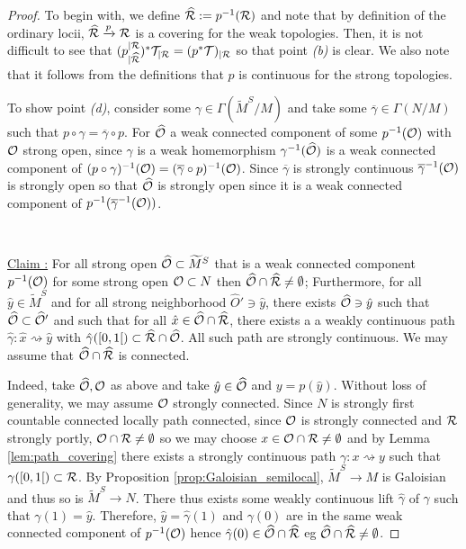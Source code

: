 \begin{proof} To begin with, we define $\widehat {\mathcal R} := p^{-1}(\mathcal R)$ and note that by definition of the ordinary locii, $\widehat {\mathcal R} \xrightarrow{p}\mathcal R$ is a covering for the weak topologies. Then, it is not difficult to see that $(p_{|\widehat {\mathcal R}}^{|\mathcal R})^*\mathcal{T}_{|\mathcal R} = (p^*\mathcal{T})_{|\mathcal R}$ so that point {\it (b)} is clear. We also note that it follows from the definitions that $p$ is continuous for the strong topologies.



To show point {\it (d)}, consider some $\gamma\in \Gamma(\widetilde M^S/M)$ and take some $\overline \gamma\in \Gamma(N/M)$ such that $p\circ \gamma = \overline \gamma\circ p$. For $\widehat {\mathcal{O}}$ a weak connected component of some $p^{-1}(\mathcal{O})$ with $\mathcal{O}$ strong open, since $\gamma$ is a weak homemorphism $\gamma^{-1}(\widehat {\mathcal{O}})$ is a weak connected component of $(p\circ \gamma)^{-1}(\mathcal{O})=(\overline \gamma\circ p )^{-1}(\mathcal{O})$. Since $\overline \gamma$ is strongly continuous $\overline \gamma^{-1}(\mathcal{O})$ is strongly open so that $\widehat {\mathcal{O}}$  is strongly open  since it is a weak connected component of $p^{-1}(\overline \gamma^{-1}(\mathcal{O}))$. 


\

\underline{Claim :}  For all strong open $\widehat {\mathcal{O}}\subset \widetilde M^S$ that is a weak connected component  $p^{-1}(\mathcal{O})$ for some strong open $\mathcal{O}\subset N$ then $ \widehat {\mathcal{O}}\cap \widehat {\mathcal R}\neq \emptyset$; Furthermore, for all $\hat y\in \widetilde M^S$ and for all strong neighborhood $\widehat O'\ni \hat y$, there exists $\widehat {\mathcal{O}}\ni \hat y$  such that $\widehat {\mathcal{O}}\subset \widehat {\mathcal{O}}'$ and such that for all $\hat x\in \widehat {\mathcal{O}}\cap \widehat {\mathcal R}$, there exists a a weakly continuous path $\hat \gamma : \hat x\rightsquigarrow \hat y$ with $\hat\gamma([0,1[)\subset \widehat {\mathcal R}\cap \widehat {\mathcal{O}}$. 
All such path are strongly continuous.  
We may assume that $\widehat{\mathcal{O}}\cap \widehat {\mathcal R}$ is connected.



Indeed, take $\widehat {\mathcal{O}},\mathcal{O}$ as above and take $\hat y\in\widehat {\mathcal{O}}$ and $y=p(\hat y)$. Without loss of generality, we may assume $\mathcal{O}$ strongly connected. Since  $N$ is strongly first countable connected locally path connected, since $\mathcal{O}$ is strongly connected and $\mathcal R$ strongly portly, $\mathcal{O}\cap \mathcal R\neq\emptyset$ so we may choose $x\in \mathcal{O}\cap \mathcal R\neq\emptyset$ and by Lemma \ref{lem:path_covering} there exists a strongly continuous path $\gamma : x\rightsquigarrow y$ such that $\gamma([0,1[)\subset \mathcal R$. By Proposition \ref{prop:Galoisian_semilocal}, $\widetilde M^S\rightarrow M$ is Galoisian and thus so is $\widetilde M^S\rightarrow N$. There thus exists some weakly continuous lift $\hat \gamma$ of $\gamma$ such that $\gamma(1)=\hat y$. Therefore, $\hat y=\hat\gamma(1)$ and $\gamma(0)$ are in the same weak connected component of $p^{-1}(\mathcal{O})$ hence $\hat\gamma(0)\in \widehat {\mathcal{O}}\cap \widehat{\mathcal R}$ eg   $\widehat {\mathcal{O}}\cap \widehat {\mathcal R}\neq \emptyset$.


\end{proof}
